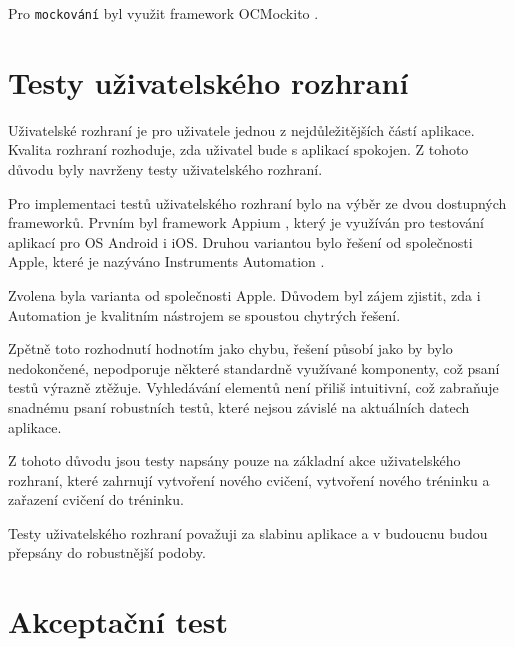 \documentclass[thesis=B,czech]{FITthesis}[2012/06/26]
\begin{document}
	Pro \texttt{mockování} byl využit framework OCMockito \cite{mockitoOnline}.

\section{Testy uživatelského rozhraní}

	Uživatelské rozhraní je pro uživatele jednou z nejdůležitějších částí aplikace. Kvalita rozhraní rozhoduje, zda uživatel bude s aplikací spokojen. Z tohoto důvodu byly navrženy testy uživatelského rozhraní.

	Pro implementaci testů uživatelského rozhraní bylo na výběr ze dvou dostupných frameworků. Prvním byl framework Appium \cite{appiumOnline}, který je využíván pro testování aplikací pro OS Android i iOS. Druhou variantou bylo řešení od společnosti Apple, které je nazýváno Instruments Automation \cite{automationOnline}.

	Zvolena byla varianta od společnosti Apple. Důvodem byl zájem zjistit, zda i Automation je kvalitním nástrojem se spoustou chytrých řešení.

	Zpětně toto rozhodnutí hodnotím jako chybu, řešení působí jako by bylo nedokončené, nepodporuje některé standardně využívané komponenty, což psaní testů výrazně ztěžuje. Vyhledávání elementů není přiliš intuitivní, což zabraňuje snadnému psaní robustních testů, které nejsou závislé na aktuálních datech aplikace.

	Z tohoto důvodu jsou testy napsány pouze na základní akce uživatelského rozhraní, které zahrnují vytvoření nového cvičení, vytvoření nového tréninku a zařazení cvičení do tréninku.

	Testy uživatelského rozhraní považuji za slabinu aplikace a v budoucnu budou přepsány do robustnější podoby.

\section{Akceptační test}
\end{document}
